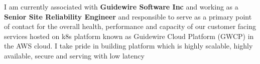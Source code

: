 
\begin{cvparagraph}

I am currently associated with \textbf{Guidewire Software Inc} and working as a \textbf{Senior Site Reliability Engineer} and responsible to serve as a primary point of contact for the overall health, performance and capacity of our customer facing services hosted on k8s platform known as Guidewire Cloud Platform (GWCP) in the AWS cloud. I take pride in building platform which is highly scalable, highly available, secure and serving with low latency
\end{cvparagraph}